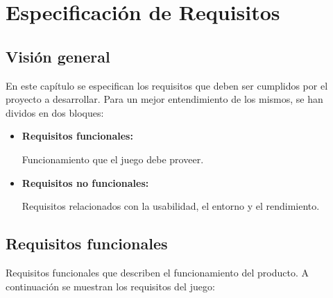 \chapter{Especificación de Requisitos}

\section{Visión general}

	En este capítulo se especifican los requisitos que deben ser cumplidos por el proyecto a desarrollar. Para un mejor entendimiento de los mismos, se han dividos en dos bloques:

	\begin{itemize}
			\item \textbf{Requisitos funcionales:}
				
			Funcionamiento que el juego debe proveer.
			
			\item \textbf{Requisitos no funcionales:}
				
			Requisitos relacionados con la usabilidad, el entorno y el rendimiento.
	\end{itemize}

\section{Requisitos funcionales}

	Requisitos funcionales que describen el funcionamiento del producto. A continuación se muestran los requisitos del juego:

